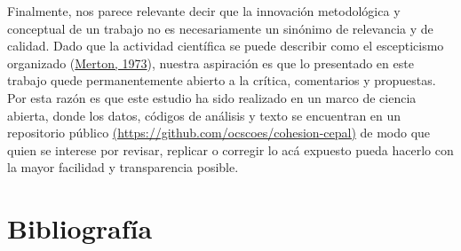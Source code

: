 \documentclass[
  12pt,
]{book}
\begin{document}
Finalmente, nos parece relevante decir que la innovación metodológica y conceptual de un trabajo no es necesariamente un sinónimo de relevancia y de calidad. Dado que la actividad científica se puede describir como el escepticismo organizado (\protect\hyperlink{ref-merton_sociology_1973}{Merton, 1973}), nuestra aspiración es que lo presentado en este trabajo quede permanentemente abierto a la crítica, comentarios y propuestas. Por esta razón es que este estudio ha sido realizado en un marco de ciencia abierta, donde los datos, códigos de análisis y texto se encuentran en un repositorio público \href{https://github.com/ocscoes/cohesion-cepal}{(https://github.com/ocscoes/cohesion-cepal)} de modo que quien se interese por revisar, replicar o corregir lo acá expuesto pueda hacerlo con la mayor facilidad y transparencia posible.

\hypertarget{bibliografuxeda}{%
\chapter*{Bibliografía}\label{bibliografuxeda}}
\end{document}
